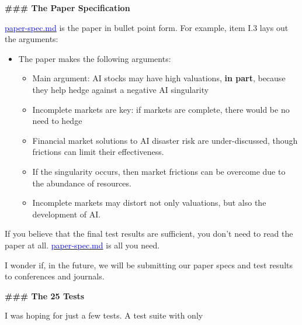 \documentclass[12pt]{article}
\begin{document}
\begin{mdframed}[
linewidth=1pt,
linecolor=black,
innerleftmargin=0.25em,
innerrightmargin=0.25em,
innertopmargin=0.2\baselineskip,
innerbottommargin=0.8\baselineskip
]
\par
{\large\bfseries \textcolor{red!70!black}{\#\#\# The Paper Specification}}
\par

\href{https://github.com/redacted/ralph-wiggum-asset-pricing/blob/main/spec/paper-spec.md}{\textcolor{blue}{paper-spec.md}} is the paper in bullet point form. For example, item I.3 lays out the arguments:

\vspace{-2ex}
\begin{itemize}
\setlength{\itemsep}{0.15em}
\setlength{\parskip}{0pt}
\item[3.] The paper makes the following arguments:
\begin{itemize}
\setlength{\itemsep}{0.15em}
\setlength{\parskip}{0pt}
\item[a.] Main argument: AI stocks may have high valuations, \textbf{in part}, because they help hedge against a negative AI singularity
\item[b.] Incomplete markets are key: if markets are complete, there would be no need to hedge
\item[c.] Financial market solutions to AI disaster risk are under-discussed, though frictions can limit their effectiveness.
\item[d.] If the singularity occurs, then market frictions can be overcome due to the abundance of resources.
\item[e.] Incomplete markets may distort not only valuations, but also the development of AI.
\end{itemize}
\end{itemize}
\vspace{-2ex}

If you believe that the final test results are sufficient, you don't need to read the paper at all. \href{https://github.com/redacted/ralph-wiggum-asset-pricing/blob/main/spec/paper-spec.md}{\textcolor{blue}{paper-spec.md}} is all you need.

I wonder if, in the future, we will be submitting our paper specs and test results to conferences and journals.

\par
{\large\bfseries \textcolor{red!70!black}{\#\#\# The 25 Tests}}
\par

I was hoping for just a few tests.  A test suite with only


\end{mdframed}
\end{document}
